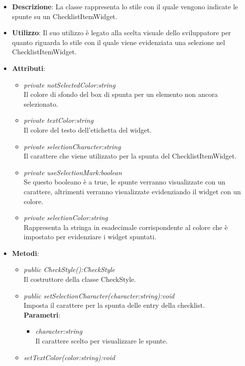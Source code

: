 \begin{itemize}
\item \textbf{Descrizione}: La classe rappresenta lo stile con il quale vengono indicate le spunte su un ChecklistItemWidget.
\item \textbf{Utilizzo}: Il suo utilizzo è legato alla scelta visuale dello sviluppatore per quanto riguarda lo stile con il quale viene evidenziata una selezione nel ChecklistItemWidget.
\item \textbf{Attributi}:
	\begin{itemize}
	\item \textit{private notSelectedColor:string}\\
	Il colore di sfondo del box di spunta per un elemento non ancora selezionato.
	\item \textit{private textColor:string}\\
	Il colore del testo dell'etichetta del widget.
	\item \textit{private selectionCharacter:string}\\
	Il carattere che viene utilizzato per la spunta del ChecklistItemWidget.
	\item \textit{private useSelectionMark:boolean}\\
	Se questo booleano è a true, le spunte verranno visualizzate con un carattere, altrimenti verranno visualizzate evidenziando il widget con un colore.
	\item \textit{private selectionColor:string}\\
	Rappresenta la stringa in esadecimale corrispondente al colore che è impostato per evidenziare i widget spuntati.
	\end{itemize}
\item \textbf{Metodi}:
	\begin{itemize}
	\item \textit{public CheckStyle():CheckStyle}\\
	Il costruttore della classe CheckStyle.
	\item \textit{public setSelectionCharacter(character:string):void}\\
	Imposta il carattere per la spunta delle entry della checklist.
		\\ \textbf{Parametri}: \begin{itemize}
		\item \textit{character:string}\\
		Il carattere scelto per visualizzare le spunte.
		\end{itemize} 
		\item \textit{setTextColor(color:string):void}\\

\end{itemize}
\end{itemize}
